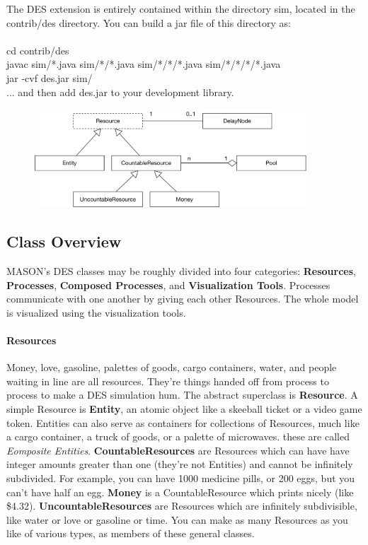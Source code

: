 \documentclass[twoside,10pt]{article}
\newcommand\file[1]{\textsf{#1}}
\newcommand\code[1]{\textsf{#1}}
\begin{document}
The DES extension is entirely contained within the directory \file{sim}, located in the \file{contrib/des} directory.  You can build a jar file of this directory as:
\\
\\
\code{cd contrib/des}\\
\code{javac sim/*.java sim/*/*.java sim/*/*/*.java sim/*/*/*/*.java}\\
\code{jar -cvf des.jar sim/}
\\

... and then add \code{des.jar} to your development library.

\begin{figure}[t]
\centering\includegraphics[width=4in]{Resources.pdf}
\end{figure}

\subsection{Class Overview}

MASON's DES classes may be roughly divided into four categories: {\bf Resources}, {\bf Processes}, {\bf Composed Processes}, and {\bf Visualization Tools}.  Processes communicate with one another by giving each other Resources.  The whole model is visualized using the visualization tools.

\paragraph{Resources}  Money, love, gasoline, palettes of goods, cargo containers, water, and people waiting in line are all resources.  They're things handed off from process to process to make a DES simulation hum.  The abstract superclass is {\bf Resource}.   A simple Resource is {\bf Entity}, an atomic object like a skeeball ticket or a video game token.  Entities can also serve as containers for collections of Resources, much like a cargo container, a truck of goods, or a palette of microwaves.  
these are called  {\it Eomposite Entities}.  {\bf CountableResources} are Resources which can have have integer amounts greater than one (they're not Entities) and cannot be infinitely subdivided.  For example, you can have 1000 medicine pills, or 200 eggs, but you can't have half an egg.  {\bf Money} is a CountableResource which prints nicely (like \$4.32).  {\bf UncountableResources} are Resources which are infinitely subdivisible, like water or love or gasoline or time.  You can make as many Resources as you like of various types, as members of these general classes.
\end{document}
